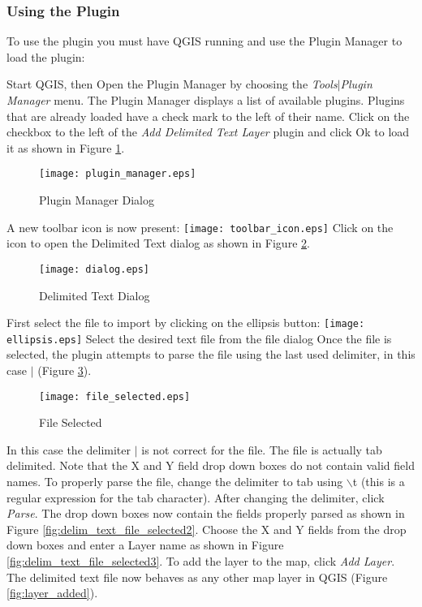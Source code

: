 \subsubsection{Using the Plugin}
To use the plugin you must have QGIS running and use the Plugin Manager to
load the plugin:

Start QGIS, then Open the Plugin Manager by choosing the {\em
Tools\mbox{$|$}Plugin Manager} menu. The Plugin Manager displays a list of
available plugins. Plugins that are already loaded have a check mark to the
left of their name. Click on the checkbox to the left of the {\em Add
Delimited Text Layer} plugin and click Ok to load it as shown in Figure
\ref{fig:plugin_manager}.

\begin{figure}[ht]
   \begin{center}
   \caption{Plugin Manager Dialog}
   \label{fig:plugin_manager}
   \smallskip
\texttt{[image: plugin\_manager.eps]}
   \end{center}  
\end{figure}


A new toolbar icon is now present:
\texttt{[image: toolbar\_icon.eps]}
Click on the icon to open the Delimited Text dialog as shown in Figure
\ref{fig:delim_text_plugin_dialog}.

\begin{figure}[ht]
   \begin{center}
   \caption{Delimited Text
Dialog}\label{fig:delim_text_plugin_dialog}\smallskip
\texttt{[image: dialog.eps]}            
   \end{center}  
\end{figure}

  
First select the file to import by clicking on the ellipsis button: 
\texttt{[image: ellipsis.eps]}
Select the desired text file from the file dialog
Once the file is selected, the plugin attempts to parse the file using the
last
used delimiter, in this case \mbox{$|$} (Figure
\ref{fig:delim_text_file_selected}).
\begin{figure}[ht]
   \begin{center}
   \caption{File Selected}\label{fig:delim_text_file_selected}\smallskip
\texttt{[image: file\_selected.eps]}   
   \end{center}  
\end{figure}

In this case the delimiter \mbox{$|$} is not correct for the file. The file is
actually tab delimited. Note that the X and Y field drop down boxes do not
contain valid field names. To properly parse the file, change the delimiter to
tab using \mbox{$\backslash$}t (this is a regular expression for the tab
character). After changing the delimiter, click {\em Parse}.
The drop down boxes now contain the fields properly parsed as shown in Figure
\ref{fig:delim_text_file_selected2}. Choose the X and Y fields from the drop
down boxes and enter a Layer name as shown in Figure
\ref{fig:delim_text_file_selected3}. To add the layer to the
map, click {\em Add Layer}. The delimited text file now behaves as any other
map layer in QGIS (Figure \ref{fig:layer_added}).

